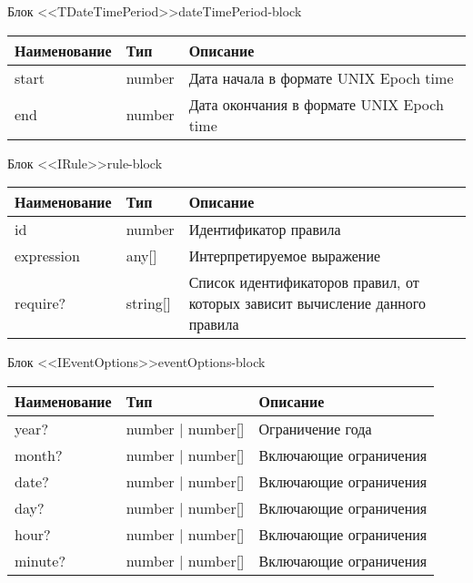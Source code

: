  \hypertarget{app-b}{\label{app-b}}


\begin{tbl}{Блок <<TDateTimePeriod>>}{dateTimePeriod-block}
  \begin{tabularx}{\textwidth}{| p{3cm} | p{6cm} | X |}
  \hline Наименование & Тип    & Описание                                 \\
  \hline start        & number & Дата начала в формате UNIX Epoch time    \\
  \hline end          & number & Дата окончания в формате UNIX Epoch time \\
  \hline
  \end{tabularx}
\end{tbl}

\begin{tbl}{Блок <<IRule>>}{rule-block}
  \begin{tabularx}{\textwidth}{| p{3cm} | p{6cm} | X |}
  \hline Наименование & Тип      & Описание                                                                     \\
  \hline id           & number   & Идентификатор правила                                                        \\
  \hline expression   & any[]    & Интерпретируемое выражение                                                   \\
  \hline require?     & string[] & Список идентификаторов правил, от которых зависит вычисление данного правила \\
  \hline
  \end{tabularx}
\end{tbl}

\begin{tbl}{Блок <<IEventOptions>>}{eventOptions-block}
  \begin{tabularx}{\textwidth}{| p{3cm} | p{6cm} | X |}
  \hline Наименование    & Тип               & Описание               \\
  \hline year?           & number | number[] & Ограничение года       \\
  \hline month?          & number | number[] & Включающие ограничения \\
  \hline date?           & number | number[] & Включающие ограничения \\
  \hline day?            & number | number[] & Включающие ограничения \\
  \hline hour?           & number | number[] & Включающие ограничения \\
  \hline minute?         & number | number[] & Включающие ограничения \\
  \hline
  \end{tabularx}
\end{tbl}


